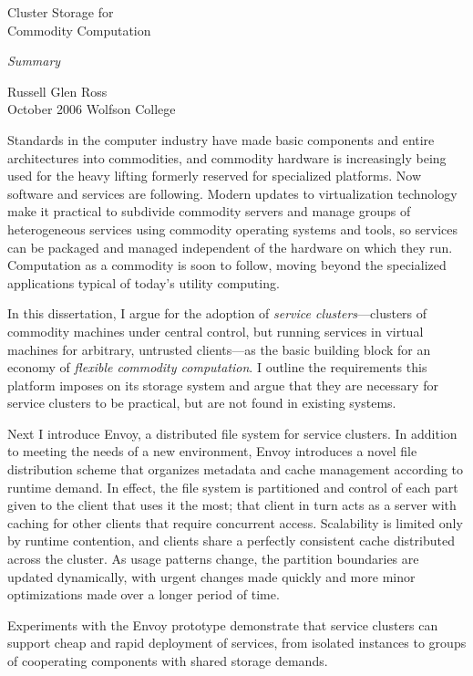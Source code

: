 

{
\thispagestyle{empty}
\begin{center}
{
    \Large Cluster Storage for\\ Commodity Computation

    \bigskip

    \textit{\large Summary}
}
\end{center}

\hfill Russell Glen Ross\\
October 2006 \hfill Wolfson College\\
}




\noindent Standards in the computer industry have made basic components and entire architectures into commodities, and commodity hardware is increasingly being used for the heavy lifting formerly reserved for specialized platforms. Now software and services are following. Modern updates to virtualization technology make it practical to subdivide commodity servers and manage groups of heterogeneous services using commodity operating systems and tools, so services can be packaged and managed independent of the hardware on which they run. Computation as a commodity is soon to follow, moving beyond the specialized applications typical of today's utility computing.

In this dissertation, I argue for the adoption of \emph{service clusters}---clusters of commodity machines under central control, but running services in virtual machines for arbitrary, untrusted clients---as the basic building block for an economy of \emph{flexible commodity computation}. I outline the requirements this platform imposes on its storage system and argue that they are necessary for service clusters to be practical, but are not found in existing systems.

Next I introduce Envoy, a distributed file system for service clusters. In addition to meeting the needs of a new environment, Envoy introduces a novel file distribution scheme that organizes metadata and cache management according to runtime demand. In effect, the file system is partitioned and control of each part given to the client that uses it the most; that client in turn acts as a server with caching for other clients that require concurrent access. Scalability is limited only by runtime contention, and clients share a perfectly consistent cache distributed across the cluster. As usage patterns change, the partition boundaries are updated dynamically, with urgent changes made quickly and more minor optimizations made over a longer period of time.

Experiments with the Envoy prototype demonstrate that service clusters can support cheap and rapid deployment of services, from isolated instances to groups of cooperating components with shared storage demands.